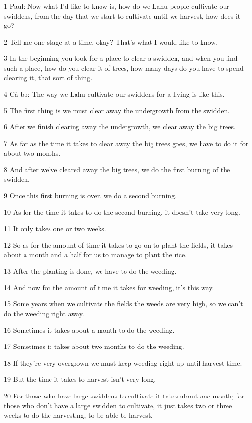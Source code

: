 
{1 Paul: Now what I'd like to know is, how do we Lahu people cultivate our
swiddens, from the day that we start to cultivate until we harvest, how does it
go?}

{2 Tell me one stage at a time, okay? That's what I would like to know.}

{3 In the beginning you look for a place to clear a swidden, and when you
find such a place, how do you clear it of trees, how many days do you have to spend
clearing it, that sort of thing.}

{4 Cà-bo: The way we Lahu cultivate our swiddens for a living is like this.}

{5 The first thing is we must clear away the undergrowth from the swidden.}

{6 After we finish clearing away the undergrowth, we clear away the big
trees.}

{7 As far as the time it takes to clear away the big trees goes, we have
to do it for about two months.}

{8 And after we've cleared away the big trees, we do the first burning of
the swidden.}

{9 Once this first burning is over, we do a second burning.}

{10 As for the time it takes to do the second burning, it doesn't take very
long.}

{11 It only takes one or two weeks.}

{12 So as for the amount of time it takes to go on to plant the fields,
it takes about a month and a half for us to manage to plant the rice.}

{13 After the planting is done, we have to do the weeding.}

{14 And now for the amount of time it takes for weeding, it's this way.}

{15 Some years when we cultivate the fields the weeds are very high, so
we can't do the weeding right away.}

{16 Sometimes it takes about a month to do the weeding.}

{17 Sometimes it takes about two months to do the weeding.}

{18 If they're very overgrown we must keep weeding right up until harvest
time.}

{19 But the time it takes to harvest isn't very long.}

{20 For those who have large swiddens to cultivate it takes about one month;
for those who don't have a large swidden to cultivate, it just takes two or three
weeks to do the harvesting, to be able to harvest.}

